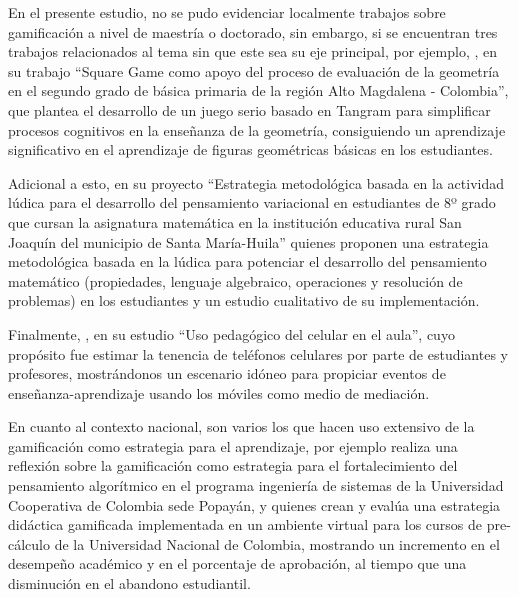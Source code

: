 
En el presente estudio, no se pudo evidenciar localmente trabajos sobre gamificación a nivel de maestría o 
doctorado, sin embargo, si se encuentran tres trabajos relacionados al tema sin que este sea su eje principal,
por ejemplo, , en su trabajo ``Square Game como apoyo del proceso de evaluación de la 
geometría en el segundo grado de básica primaria de la región Alto Magdalena - Colombia'', que plantea el 
desarrollo de un juego serio basado en Tangram para simplificar procesos cognitivos en la enseñanza de la 
geometría, consiguiendo un aprendizaje significativo en el aprendizaje de figuras geométricas básicas en los 
estudiantes.

Adicional a esto,  en su proyecto ``Estrategia metodológica basada en la actividad lúdica para 
el desarrollo del pensamiento variacional en estudiantes de 8º grado que cursan la asignatura matemática en la 
institución educativa rural San Joaquín del municipio de Santa María-Huila'' quienes proponen una estrategia 
metodológica basada en la lúdica para potenciar el desarrollo del pensamiento matemático (propiedades, 
lenguaje algebraico, operaciones y resolución de problemas) en los estudiantes y un estudio cualitativo de su 
implementación.

Finalmente, , en su estudio ``Uso pedagógico del celular en el aula'', cuyo propósito fue 
estimar la tenencia de teléfonos celulares por parte de estudiantes y profesores, mostrándonos un escenario 
idóneo para propiciar eventos de enseñanza-aprendizaje usando los móviles como medio de mediación.

En cuanto al contexto nacional, son varios los que hacen uso extensivo de la gamificación como estrategia para
el aprendizaje, por ejemplo  realiza una reflexión sobre la gamificación como estrategia 
para el fortalecimiento del pensamiento algorítmico en el programa ingeniería de sistemas de la Universidad 
Cooperativa de Colombia sede Popayán, y  quienes crean y evalúa una estrategia didáctica 
gamificada implementada en un ambiente virtual para los cursos de pre-cálculo de la Universidad Nacional de 
Colombia, mostrando un incremento en el desempeño académico y en el porcentaje de aprobación, al tiempo que
una disminución en el abandono estudiantil.

